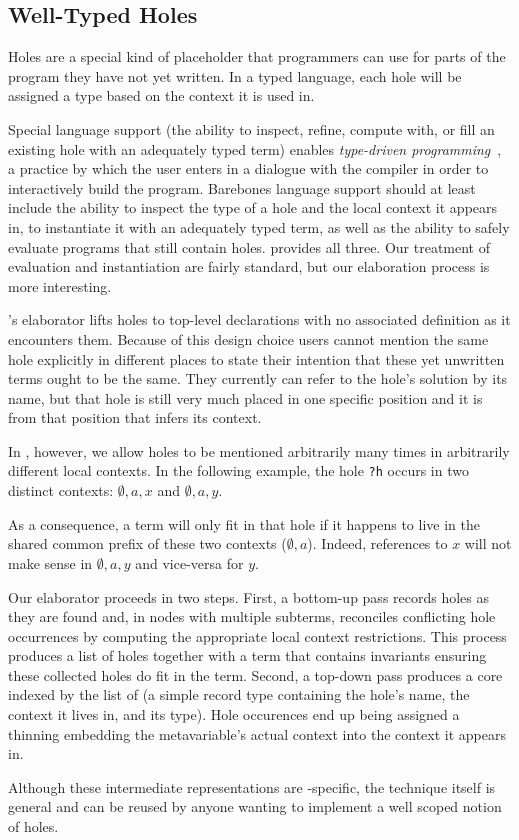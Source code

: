 \subsection{Well-Typed Holes}
\label{sec:design:holes}

Holes are a special kind of placeholder that programmers can use for parts of
the program they have not yet written.
%
In a typed language, each hole will be assigned a type based on the context it
is used in.

Special language support (the ability to inspect, refine, compute with,
or fill an existing hole with an adequately typed term)
enables \emph{type-driven programming}~\cite{DBLP:journals/pacmpl/OmarVCH19},
a practice by which the user enters in a dialogue with the compiler in order
to interactively build the program.
%
Barebones language support should at least include the ability to inspect the
type of a hole and the local context it appears in, to instantiate it with an
adequately typed term, as well as the ability to
safely evaluate programs that still contain holes.
%
\Velo{} provides all three.
%
Our treatment of evaluation and instantiation are fairly standard, but our
elaboration process is more interesting.

\Idris{}'s elaborator lifts holes to top-level declarations with no associated
definition as it encounters them.
%
Because of this design choice users cannot mention the same hole explicitly in
different places to state their intention that these yet unwritten terms ought
to be the same.
%
They currently can refer to the hole's solution by its name, but that hole is
still very much placed in one specific position and it is from that position
that \Idris{} infers its context.

In \Velo{}, however, we allow holes to be mentioned arbitrarily many times in
arbitrarily different local contexts. In the following example, the hole
\texttt{?h} occurs in two distinct contexts: $\emptyset,a,x$ and $\emptyset,a,y$.

\begin{center}
  \holeexamplegraph{}
\end{center}

As a consequence, a term will only fit in that hole if it happens to live in the
shared common prefix of these two contexts ($\emptyset,a$).
%
Indeed, references to $x$ will not make sense in $\emptyset,a,y$ and vice-versa for $y$.


Our elaborator proceeds in two steps.
%
First, a bottom-up pass records holes as they are found and, in nodes
with multiple subterms, reconciles conflicting hole occurrences by
computing the appropriate local context restrictions.
%
This process produces a list of holes together with a 
term that contains invariants ensuring these collected holes do fit in the term.
%
Second, a top-down pass produces a core  indexed by the list
of  (a simple record type containing the hole's name, the context
it lives in, and its type). Hole occurences end up being assigned a thinning
embedding the metavariable's actual context into the context it appears in.

Although these intermediate representations are \Velo{}-specific, the technique
itself is general and can be reused by anyone wanting to implement a well scoped
notion of holes.

